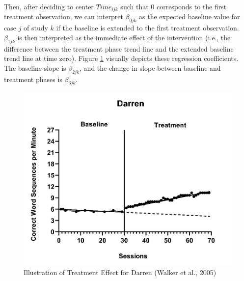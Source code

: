 \documentclass[
]{book}
\begin{document}
Then, after deciding to center \(Time_{ijk}\) such that 0 corresponds to the first treatment observation, we can interpret \(\beta_{0jk}\) as the expected baseline value for case \(j\) of study \(k\) if the baseline is extended to the first treatment observation. \(\beta_{1jk}\) is then interpreted as the immediate effect of the intervention (i.e., the difference between the treatment phase trend line and the extended baseline trend line at time zero). Figure \ref{fig:Walker-Darren} visually depicts these regression coefficients. The baseline slope is \(\beta_{2jk}\), and the change in slope between baseline and treatment phases is \(\beta_{3jk}\).

\begin{figure}
\includegraphics[width=0.6\linewidth]{images/Walker2005_Darren} \caption{Illustration of Treatment Effect for Darren (Walker et al., 2005)}\label{fig:Walker-Darren}
\end{figure}
\end{document}
